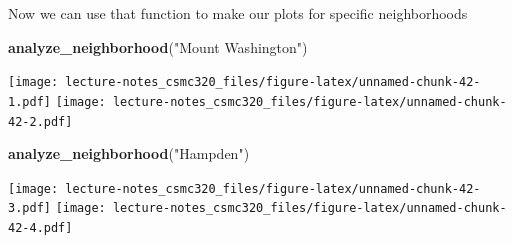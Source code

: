 \documentclass[12pt,]{book}
\newenvironment{Shaded}{\begin{snugshade}}{\end{snugshade}}
\newcommand{\KeywordTok}[1]{\textcolor[rgb]{0.13,0.29,0.53}{\textbf{#1}}}
\newcommand{\DataTypeTok}[1]{\textcolor[rgb]{0.13,0.29,0.53}{#1}}
\newcommand{\StringTok}[1]{\textcolor[rgb]{0.31,0.60,0.02}{#1}}
\newcommand{\ControlFlowTok}[1]{\textcolor[rgb]{0.13,0.29,0.53}{\textbf{#1}}}
\newcommand{\OperatorTok}[1]{\textcolor[rgb]{0.81,0.36,0.00}{\textbf{#1}}}
\newcommand{\NormalTok}[1]{#1}
\theoremstyle{definition}
\theoremstyle{definition}
\theoremstyle{definition}
\theoremstyle{remark}
\begin{document}
\begin{Shaded}
\end{Shaded}

Now we can use that function to make our plots for specific
neighborhoods

\begin{Shaded}
\begin{Highlighting}[]
\KeywordTok{analyze_neighborhood}\NormalTok{(}\StringTok{"Mount Washington"}\NormalTok{)}
\end{Highlighting}
\end{Shaded}

\texttt{[image: lecture-notes\_csmc320\_files/figure-latex/unnamed-chunk-42-1.pdf]}
\texttt{[image: lecture-notes\_csmc320\_files/figure-latex/unnamed-chunk-42-2.pdf]}

\begin{Shaded}
\begin{Highlighting}[]
\KeywordTok{analyze_neighborhood}\NormalTok{(}\StringTok{"Hampden"}\NormalTok{)}
\end{Highlighting}
\end{Shaded}

\texttt{[image: lecture-notes\_csmc320\_files/figure-latex/unnamed-chunk-42-3.pdf]}
\texttt{[image: lecture-notes\_csmc320\_files/figure-latex/unnamed-chunk-42-4.pdf]}
\end{document}
